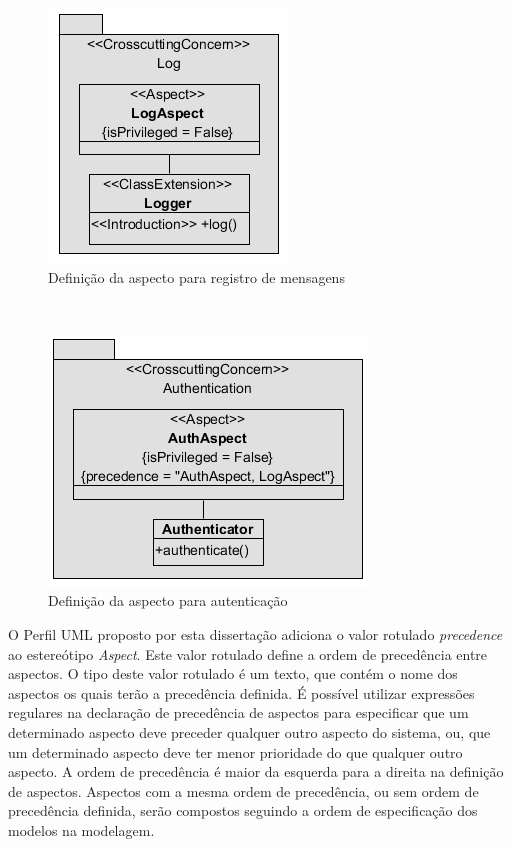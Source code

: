   \begin{figure}[!h]
	\centering
	\includegraphics{img/log_aspect.png}
	\caption{Definição da aspecto para registro de mensagens}\label{fig:log_aspect}
  \end{figure}
  \
  \begin{figure}[!h]
	\centering
	\includegraphics{img/auth_aspect.png}
	\caption{Definição da aspecto para autenticação}\label{fig:auth_aspect}
  \end{figure}

O Perfil UML proposto por esta dissertação adiciona o valor rotulado \textit{precedence} ao estereótipo \textit{Aspect}. Este valor rotulado define a
ordem de precedência entre aspectos. O tipo deste valor rotulado é um texto, que contém o nome dos aspectos os quais terão a precedência definida.
É possível utilizar expressões regulares na declaração de precedência de aspectos para especificar que um determinado aspecto deve preceder qualquer
outro aspecto do sistema, ou, que um determinado aspecto deve ter menor prioridade do que qualquer outro aspecto. A ordem de precedência é maior da
esquerda para a direita na definição de aspectos. Aspectos com a mesma ordem de precedência, ou sem ordem de precedência definida, serão compostos
seguindo a ordem de especificação dos modelos na modelagem.

